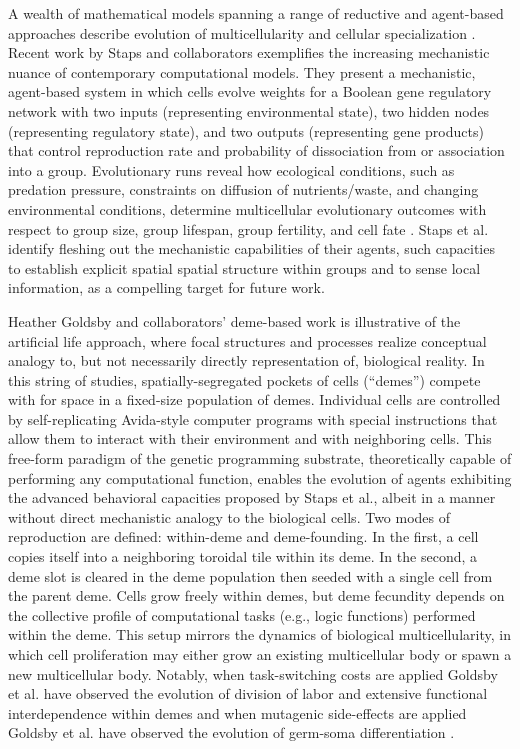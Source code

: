 A wealth of mathematical models spanning a range of reductive and agent-based approaches describe evolution of multicellularity and cellular specialization \cite{hanschen2015evolutionary}.
Recent work by Staps and collaborators exemplifies the increasing mechanistic nuance of contemporary computational models.
They present a mechanistic, agent-based system in which cells evolve weights for a Boolean gene regulatory network with two inputs (representing environmental state), two hidden nodes (representing regulatory state), and two outputs (representing gene products) that control reproduction rate and probability of dissociation from or association into a group.
Evolutionary runs reveal how ecological conditions, such as predation pressure, constraints on diffusion of nutrients/waste, and changing environmental conditions, determine multicellular evolutionary outcomes with respect to group size, group lifespan, group fertility, and cell fate \citep{staps2019emergence}.
Staps et al. identify fleshing out the mechanistic capabilities of their agents, such capacities to establish explicit spatial spatial structure within groups and to sense local information, as a compelling target for future work.

Heather Goldsby and collaborators' deme-based work is illustrative of the artificial life approach, where focal structures and processes realize conceptual analogy to, but not necessarily directly representation of, biological reality.
In this string of studies, spatially-segregated pockets of cells (``demes'') compete with for space in a fixed-size population of demes.
Individual cells are controlled by self-replicating Avida-style computer programs with special instructions that allow them to interact with their environment and with neighboring cells.
This free-form paradigm of the genetic programming substrate, theoretically capable of performing any computational function, enables the evolution of agents exhibiting the advanced behavioral capacities proposed by Staps et al., albeit in a manner without direct mechanistic analogy to the biological cells.
Two modes of reproduction are defined: within-deme and deme-founding.
In the first, a cell copies itself into a neighboring toroidal tile within its deme.
In the second, a deme slot is cleared in the deme population then seeded with a single cell from the parent deme.
Cells grow freely within demes, but deme fecundity depends on the collective profile of computational tasks (e.g., logic functions) performed within the deme.
This setup mirrors the dynamics of biological multicellularity, in which cell proliferation may either grow an existing multicellular body or spawn a new multicellular body.
Notably, when task-switching costs are applied Goldsby et al. have observed the evolution of division of labor and extensive functional interdependence within demes and when mutagenic side-effects are applied Goldsby et al. have observed the evolution of germ-soma differentiation \citep{goldsby2012task, goldsby2014evolutionary}.

